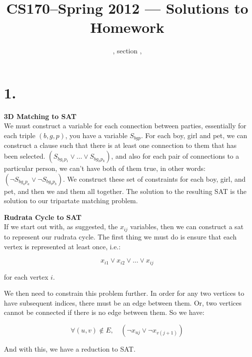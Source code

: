 \documentclass[11pt]{article}
\title{CS170--Spring 2012 --- Solutions to Homework \HW}
\author{\Name, section \Sec, \texttt{\Login}}
\begin{document}
\maketitle

\section*{1.}
{\bf 3D Matching to SAT}\\
We must construct a variable for each connection between parties, essentially
for each triple $(b, g, p)$, you have a variable $S_{bgp}$. For each boy, girl
and pet, we can construct a clause such that there is at least one connection
to them that has been selected. $(S_{bg_1p_1} \lor \dots \lor S_{bg_kp_k})$,
and also for each pair of connections to a particular person, we can't have
both of them true, in other words: $(\lnot S_{bg_ap_a} \lor \lnot
S_{bg_bp_b})$. We construct these set of constraints for each boy, girl, and
pet, and then we and them all together. The solution to the resulting SAT is
the solution to our tripartate matching problem.

{\bf Rudrata Cycle to SAT}\\
If we start out with, as suggested, the $x_{ij}$ variables, then we can
construct a sat to represent our rudrata cycle. The first thing we must do is
ensure that each vertex is represented at least once, i.e.:

\begin{equation*}
x_{i1} \lor x_{i2} \lor \dots \lor x_{ij}
\end{equation*}

for each vertex $i$.

We then need to constrain this problem further. In order for any two vertices
to have subsequent indices, there must be an edge between them. Or, two
vertices cannot be connected if there is no edge between them. So we have:

\begin{equation*}
\forall (u,v) \notin E, \quad (\lnot x_{uj} \lor \lnot x_{v(j+1)})
\end{equation*}

And with this, we have a reduction to SAT.

\newpage
\end{document}
